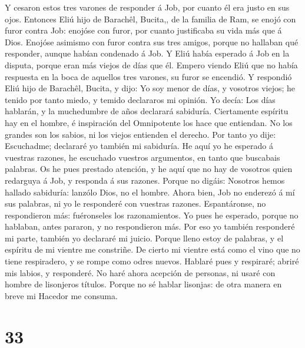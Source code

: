  Y cesaron estos tres varones de responder á Job, por
cuanto él era justo en sus ojos.  Entonces Eliú hijo de
Barachêl, Bucita,, de la familia de Ram, se enojó con furor contra Job:
enojóse con furor, por cuanto justificaba su vida más que á Dios.
 Enojóse asimismo con furor contra sus tres amigos, porque
no hallaban qué responder, aunque habían condenado á Job. 
Y Eliú había esperado á Job en la disputa, porque eran más viejos de
días que él.  Empero viendo Eliú que no había respuesta en
la boca de aquellos tres varones, su furor se encendió.  Y
respondió Eliú hijo de Barachêl, Bucita, y dijo: Yo soy menor de días, y
vosotros viejos; he tenido por tanto miedo, y temido declararos mi
opinión.  Yo decía: Los días hablarán, y la muchedumbre de
años declarará sabiduría.  Ciertamente espíritu hay en el
hombre, é inspiración del Omnipotente los hace que entiendan.
 No los grandes son los sabios, ni los viejos entienden el
derecho.  Por tanto yo dije: Escuchadme; declararé yo
también mi sabiduría.  He aquí yo he esperado á vuestras
razones, he escuchado vuestros argumentos, en tanto que buscabais
palabras.  Os he pues prestado atención, y he aquí que no
hay de vosotros quien redarguya á Job, y responda á sus razones.
 Porque no digáis: Nosotros hemos hallado sabiduría:
lanzólo Dios, no el hombre.  Ahora bien, Job no enderezó
á mí sus palabras, ni yo le responderé con vuestras razones.
 Espantáronse, no respondieron más: fuéronseles los
razonamientos.  Yo pues he esperado, porque no hablaban,
antes pararon, y no respondieron más.  Por eso yo también
responderé mi parte, también yo declararé mi juicio. 
Porque lleno estoy de palabras, y el espíritu de mi vientre me
constriñe.  De cierto mi vientre está como el vino que no
tiene respiradero, y se rompe como odres nuevos.  Hablaré
pues y respiraré; abriré mis labios, y responderé.  No
haré ahora acepción de personas, ni usaré con hombre de lisonjeros
títulos.  Porque no sé hablar lisonjas: de otra manera en
breve mi Hacedor me consuma.

\hypertarget{section-32}{%
\section{33}\label{section-32}}

